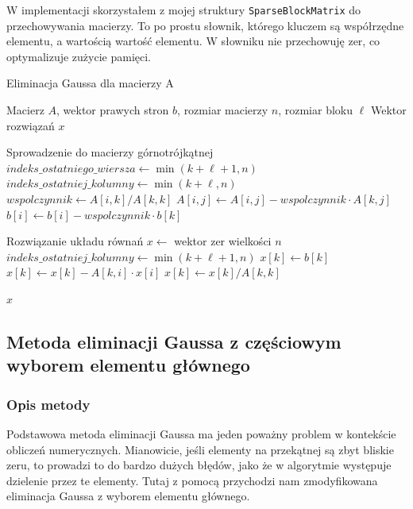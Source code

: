 \documentclass{article}
\begin{document}
W implementacji skorzystałem z mojej struktury \texttt{SparseBlockMatrix} do przechowywania macierzy.
To po prostu słownik, którego kluczem są współrzędne elementu, a wartością wartość elementu.
W słowniku nie przechowuję zer, co optymalizuje zużycie pamięci.

\begin{algorithm}[H]
\caption{Eliminacja Gaussa dla macierzy A}
\begin{algorithmic}[1]
\Require Macierz $A$, wektor prawych stron $b$, rozmiar macierzy $n$, rozmiar bloku $\ell$
\Ensure Wektor rozwiązań $x$

\Comment Sprowadzenie do macierzy górnotrójkątnej
    \State $indeks\_ostatniego\_wiersza \gets \min(k + \ell + 1, n)$
    \State $indeks\_ostatniej\_kolumny \gets \min(k + \ell, n)$
        \State $wspolczynnik \gets A[i, k] / A[k, k]$
            \State $A[i, j] \gets A[i, j] - wspolczynnik \cdot A[k, j]$
        \EndFor
        \State $b[i] \gets b[i] - wspolczynnik \cdot b[k]$
    \EndFor
\EndFor


\Comment Rozwiązanie układu równań
\State $x \gets$ wektor zer wielkości $n$
    \State $indeks\_ostatniej\_kolumny \gets \min(k + \ell + 1, n)$
    \State $x[k] \gets b[k]$
        \State $x[k] \gets x[k] - A[k, i] \cdot x[i]$
    \EndFor
    \State $x[k] \gets x[k] / A[k, k]$
\EndFor

\noindent \Return $x$
\end{algorithmic}
\end{algorithm}

\subsection{Metoda eliminacji Gaussa z częściowym wyborem elementu głównego}
\subsubsection{Opis metody}
Podstawowa metoda eliminacji Gaussa ma jeden poważny problem w kontekście obliczeń numerycznych.
Mianowicie, jeśli elementy na przekątnej są zbyt bliskie zeru, to prowadzi to do bardzo dużych błędów, jako że w algorytmie występuje dzielenie przez te elementy.
Tutaj z pomocą przychodzi nam zmodyfikowana eliminacja Gaussa z wyborem elementu głównego.\\
\end{document}
